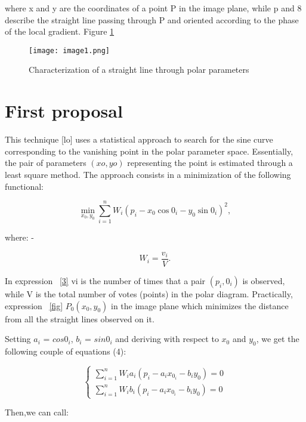 \documentclass[12pt]{article}
\begin{document}
\raggedright where x and y are the coordinates of a point P in the image plane, while p and 8 describe the straight line passing through P and oriented according to the phase of the local gradient. Figure 
\ref{label1}
\noindent

\begin{figure}
    \centering
    \texttt{[image: image1.png]}
    \caption{Characterization of a straight line through polar parameters}
    \label{label1}
\end{figure}



\newpage
\section {First proposal}

\raggedright This technique [lo] uses a statistical approach to search for the sine curve corresponding to the vanishing point in the polar parameter space. Essentially, the pair of parameters $(xo, yo)$ representing the point is estimated through a least square method. The approach consists in a minimization of the following functional:
\noindent

\begin{equation}\label{fig}
\min_{x_0,y_0} ⁡\sum^n_{i=1} W_i  (p_i-x_0  \cos⁡0_i-y_0  \sin⁡{0_i})^2,
\end{equation}

\raggedright where:
\noindent
-

\begin{equation}\label{3}
W_i=\frac{v_i}{V}.
\end{equation}

\raggedright In expression ~\eqref{3} vi is the number of times that a pair $(p_i,0_i)$ is observed, while V is the total number of votes (points) in the polar diagram. Practically, expression  ~\eqref{fig} $P_0(x_0, y_0)$ in the image plane which minimizes the distance from all the straight lines observed on it.
\noindent
\newline
\raggedright Setting $a_i$ = $cos⁡{0_i}$, $b_i$ = $sin{0_i}$ and deriving with respect to $x_0$ and $y_0$, we get the following couple of equations (4\label{sum}):
\noindent

\begin{equation}\label{sum}
 \begin{cases}
  \sum\limits^n_{i=1} W_i a_i (p_i-a_i x_0_i - b_i y_0) = 0 \\
  \sum\limits^n_{i=1} W_i b_i (p_i-a_i x_0_i - b_i y_0) = 0 
\end{cases}
\end{equation}
\newline
\raggedright Then,we can call:
\noindent
\end{document}
